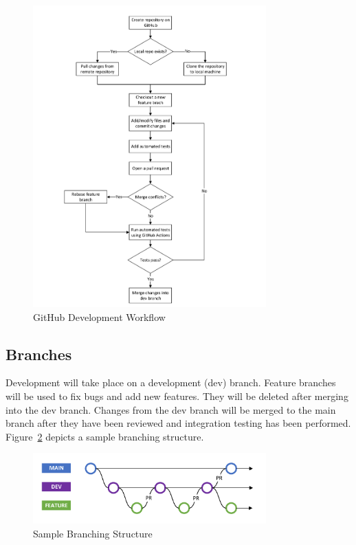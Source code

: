 \documentclass[titlepage]{article}
\begin{document}
\begin{figure} [H]
\begin{center}
	\includegraphics [width=0.8\textwidth] {Figures/GitHub Workflow.pdf}
	\caption{GitHub Development Workflow}
	\label{fig:Workflow}
	\end{center}
\end{figure}

\subsection{Branches}

Development will take place on a development (dev) branch. Feature branches will be used to fix bugs and add new features. They will be deleted after merging into the dev branch.  Changes from the dev branch will be merged to the main branch after they have been reviewed and integration testing has been performed. Figure~\ref{fig:Branches} depicts a sample branching structure.

\begin{figure} [H]
\begin{center}
	\includegraphics [width=0.8\textwidth] {Figures/GitHub Branches.pdf}
	\caption{Sample Branching Structure}
	\label{fig:Branches}
	\end{center}
\end{figure}
\end{document}
